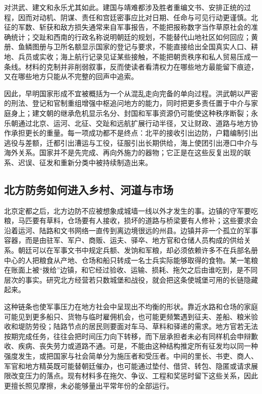 对洪武、建文和永乐尤其如此。建国与靖难都涉及胜者重编文书、安排正统的过程，因而对动机、阴谋、责任和宫廷密事应比对日期、任命与可见行动更谨慎。北征的军数、斩获和敌方损失通常来自军事报告，不能把报称数字当作草原社会的准确统计；交趾和西南的行政名称说明朝廷的规划，不能替代山地社区如何回应；黄册、鱼鳞图册与卫所名额显示国家的登记与要求，不能直接给出全国真实人口、耕地、兵员或实收；海上航行记录见证某些接触，不能把朝贡秩序和私人贸易压成一条线。材料的克制并非削弱叙事，反而使读者看清权力在哪些地方最能留下痕迹，又在哪些地方只能从不完整的回声中追索。

因此，早明国家形成不宜被概括为一个从混乱走向完备的单向过程。洪武朝以严密的刑法、登记和官制重组增强中枢追问地方的能力，同时把更多责任置于中介与家庭身上；建文朝的继承危机显示名分、封国和军事资源仍可能使这种秩序断裂；永乐朝通过北京、运河、北征、交趾和远航扩展行动半径，又让财政、道路与地方协作承担更长的重量。每一项成功都不是终点：北平的接收引出边防，户籍编制引出逃役与差额，迁都引出漕运与工役，征服引出长期供给，海上使团引出港口中介与海外关系。国家并不是先完成、再向外施力的器物；它正是在这些反复出现的联系、迟误、征发和重新分类中被持续制造出来。

\subsection{北方防务如何进入乡村、河道与市场}

北京定都之后，北方边防不应被想象成城墙一线以外才发生的事。边镇的守军要吃粮，马匹要有草料，仓场要有人接收，损坏的道路与桥梁要有人修补；这些要求会沿着运河、陆路和文书网络一直传到离边境很远的州县。边镇并非一个孤立的军事容器，而是由驻军、军户、商贩、运夫、驿卒、地方官和仓储人员构成的供给关系。朝廷可以在军事文书中规定兵额、发饷和军粮，却必须依赖许多不在兵部名册中心的人把粮食从产地、仓场和船只转成一名士兵实际能够取得的食物。某一笔粮在账面上被“拨给”边镇，和它经过验收、运输、损耗、拖欠之后由谁吃到，是不同层次的事实。研究北方经营若只数城堡和战役，就会把这条使城堡可用的长链隐藏起来。

这种链条也使军事压力在地方社会中呈现出不均衡的形状。靠近水路和仓场的家庭可能见到更多船只、货物与临时雇佣机会，也可能更频繁遇到征夫、差船、粮米验收和堤防劳役；陆路节点的居民则要面对车马、草料和驿递的需求。地方官若无法按期完成任务，往往会把时间压力向下转移，而下层承担者未必有同样机会申辩歉收、疾病、丧失劳力或道路不通。可是，不能由这种结构推定所有征发均以同一种强度发生，或把国家与社会简单分为施压者和受压者。中间的里长、书吏、商人、军官和地方精英既可能替朝廷催办，也可能通过垫付、借贷、转包、隐匿或请求展限改变压力的落点。现有材料多在拖欠、争议、工程和奖惩时留下这些关系，因此更擅长照见摩擦，未必能够量出平常年份的全部运行。

